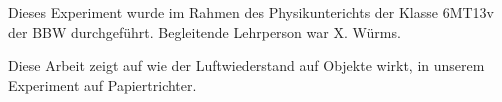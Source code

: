 Dieses Experiment wurde im Rahmen des Physikunterichts der Klasse 6MT13v der BBW durchgeführt. Begleitende Lehrperson war X. Würms.

Diese Arbeit zeigt auf wie der Luftwiederstand auf Objekte wirkt, in unserem Experiment auf Papiertrichter.